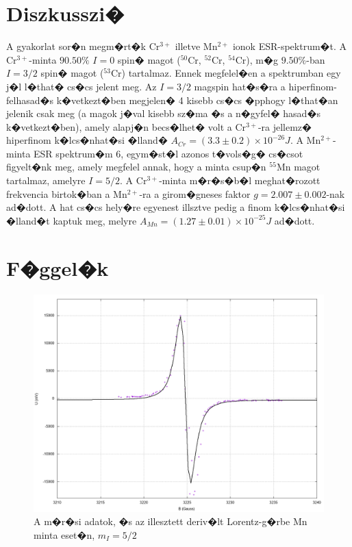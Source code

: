 \documentclass[a4paper,12pt]{article}
\begin{document}
\section{Diszkusszi�}

A gyakorlat sor�n megm�rt�k Cr$^{3+}$ illetve Mn$^{2+}$ ionok ESR-spektrum�t. A Cr$^{3+}$-minta $90.50\%$ $I=0$ spin� magot ($^{50}$Cr, $^{52}$Cr, $^{54}$Cr), m�g $9.50\%$-ban $I=3/2$ spin� magot ($^{53}$Cr) tartalmaz. Ennek megfelel�en a spektrumban egy j�l l�that� cs�cs jelent meg. Az $I=3/2$ magspin hat�s�ra a hiperfinom-felhasad�s k�vetkezt�ben megjelen� 4 kisebb cs�cs �pphogy l�that�an jelenik csak meg (a magok j�val kisebb sz�ma �s a n�gyfel� hasad�s k�vetkezt�ben), amely alapj�n becs�lhet� volt a Cr$^{3+}$-ra jellemz� hiperfinom k�lcs�nhat�si �lland� $A_{Cr}=(3.3\pm 0.2)\times10^{-26}J$. 
A Mn$^{2+}$-minta ESR spektrum�m 6, egym�st�l azonos t�vols�g� cs�csot figyelt�nk meg, amely megfelel annak, hogy a minta csup�n $^{55}$Mn magot tartalmaz, amelyre $I= 5/2$. A Cr$^{3+}$-minta m�r�s�b�l meghat�rozott frekvencia birtok�ban a Mn$^{2+}$-ra a girom�gneses faktor $g=2.007\pm0.002$-nak ad�dott. A hat cs�cs hely�re egyenest illsztve pedig a finom k�lcs�nhat�si �lland�t kaptuk meg, melyre $A_{Mn}= (1.27 \pm 0.01) \times10^{-25} J$ ad�dott.

\section{F�ggel�k}

\begin{figure}[H]
\includegraphics[width=15cm]{Mn1.png}
\centering
\caption{A m�r�si adatok, �s az illesztett deriv�lt Lorentz-g�rbe Mn minta eset�n, $m_I = 5/2$}
\label{fig:4}
\end{figure}
\end{document}

